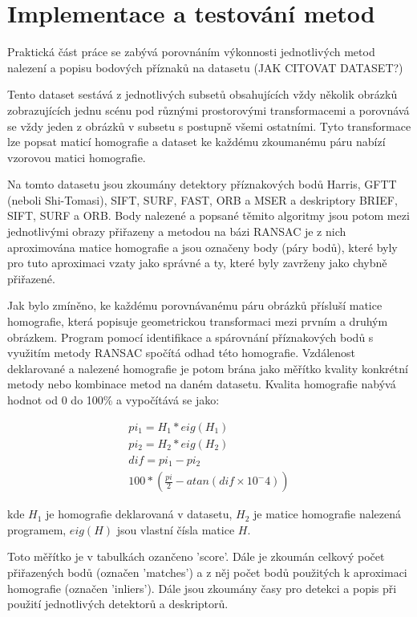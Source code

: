 
\chapter{Implementace a testování metod}

Praktická část práce se zabývá porovnáním výkonnosti jednotlivých
metod nalezení a popisu bodových příznaků na datasetu (JAK CITOVAT DATASET?)

Tento dataset sestává z jednotlivých subsetů obsahujících vždy několik obrázků
zobrazujících jednu scénu pod různými prostorovými transformacemi a porovnává se
vždy jeden z obrázků v subsetu s postupně všemi ostatními. Tyto transformace
lze popsat maticí homografie a dataset ke každému zkoumanému páru nabízí vzorovou
matici homografie.

Na tomto datasetu jsou zkoumány detektory příznakových bodů Harris, GFTT (neboli
Shi-Tomasi), SIFT, SURF, FAST, ORB a MSER a deskriptory BRIEF, SIFT, SURF a ORB.
Body nalezené a popsané těmito algoritmy jsou potom mezi jednotlivými obrazy
přiřazeny a metodou na bázi RANSAC je z nich aproximována matice homografie a 
jsou označeny body (páry bodů), které byly pro tuto aproximaci vzaty jako správné a ty, 
které byly zavrženy jako chybně přiřazené. 


Jak bylo zmíněno, ke každému porovnávanému páru obrázků přísluší matice homografie,
která popisuje geometrickou transformaci mezi prvním a druhým obrázkem. Program
pomocí identifikace a spárovnání příznakových bodů s využitím metody RANSAC spočítá
odhad této homografie. Vzdálenost deklarované a nalezené homografie je potom brána
jako měřítko kvality konkrétní metody nebo kombinace metod na daném datasetu. Kvalita
homografie nabývá hodnot od 0 do 100\% a vypočítává se jako:

\begin{align}
	pi_1 = H_1 * eig(H_1) \\
	pi_2 = H_2 * eig(H_2) \\
	dif = pi_1 - pi_2 \\
	100*(\frac{pi}{2} - atan(dif \times{} 10^-4))
\end{align}

kde $H_1$ je homografie deklarovaná v datasetu, $H_2$ je matice homografie nalezená
programem, $eig(H)$ jsou vlastní čísla matice $H$. 

Toto měřítko je v tabulkách ozančeno 'score'. Dále je zkoumán celkový počet přiřazených
bodů (označen 'matches') a z něj počet bodů použitých k aproximaci homografie (označen 'inliers').
Dále jsou zkoumány časy pro detekci a popis při použití jednotlivých detektorů a deskriptorů. 

